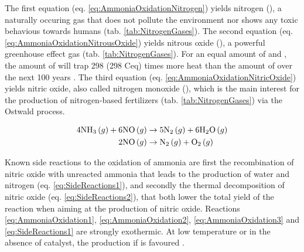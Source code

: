 The first equation (eq. \ref{eq:AmmoniaOxidationNitrogen}) yields nitrogen (\nitrogen), a naturally occuring gas that does not pollute the environment nor shows any toxic behavious towards humans (tab. \ref{tab:NitrogenGases}).
The second equation (eq. \ref{eq:AmmoniaOxidationNitrousOxide}) yields nitrous oxide (\nitrousoxide), a powerful greenhouse effect gas (tab. \ref{tab:NitrogenGases}).
For an equal amount of \nitrousoxide and \carbondioxide, the amount of \nitrousoxide will trap 298 (298 Ceq) times more heat than the amount of \carbondioxide over the next 100 years \parencite{MITCLIMATE}.
The third equation (eq. \ref{eq:AmmoniaOxidationNitricOxide}) yields nitric oxide, also called nitrogen monoxide (\nitricoxide), which is the main interest for the production of nitrogen-based fertilizers (tab. \ref{tab:NitrogenGases}) via the Ostwald process.

\begin{align}
    \label{eq:SideReactions1}
    4 \ammonia (g) + 6 \nitricoxide (g) & \rightarrow 5 \nitrogen (g) + 6 \water (g)\\
    \label{eq:SideReactions2}
    2 \nitricoxide (g) & \rightarrow \nitrogen (g) + \dioxygen (g)
\end{align}

Known side reactions to the oxidation of ammonia are first the recombination of nitric oxide with unreacted ammonia that leads to the production of water and nitrogen (eq. \ref{eq:SideReactions1}), and secondly the thermal decomposition of nitric oxide (eq. \ref{eq:SideReactions2}), that both lower the total yield of the reaction when aiming at the production of nitric oxide.
Reactions \ref{eq:AmmoniaOxidation1}, \ref{eq:AmmoniaOxidation2}, \ref{eq:AmmoniaOxidation3} and \ref{eq:SideReactions1} are strongly exothermic.
At low temperature or in the absence of catalyst, the production if \nitrogen is favoured \parencite{Hatscher2008}.

